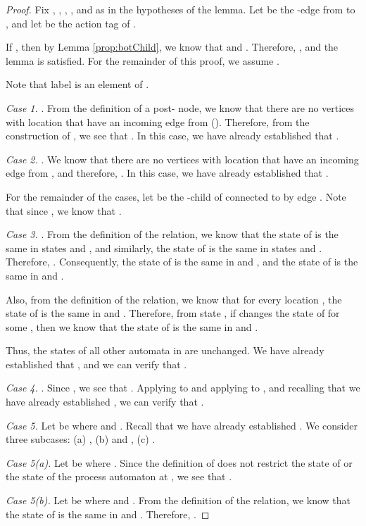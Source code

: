 \documentclass[11pt]{article}
\numberwithin{theorem}{section}
\begin{document}
\begin{proof}
 Fix , , , , and  as in the hypotheses of the lemma. Let  be the -edge from  to , and let  be the action tag of . 
 
 If , then by Lemma \ref{prop:botChild}, we know that  and . Therefore, , and the lemma is satisfied. For the remainder of this proof, we assume .
 
 Note that label  is an element of .
  
  \emph{Case 1.} . From the definition of a post- node, we know that there are no vertices with location  that have an incoming edge from  (). Therefore, from the construction of , we see that . In this case, we have already established that .
  
  \emph{Case 2.} . We know that there are no vertices with location  that have an incoming edge from , and therefore, . In this case, we have already established that .
  
For the remainder of the cases, let  be the -child of  connected to  by edge . Note that since , we know that .  


  
 \emph{Case 3.} . From the definition of the  relation, we know that the state of   is the same in states  and , and similarly, the state of  is the same in states  and . Therefore, . Consequently, the state of   is the same in  and , and the state of  is the same in  and . 
 
 Also, from the definition of the  relation, we know that for every location , the state of  is the same in  and . Therefore, from state , if  changes the state of  for some , then we know that the state of  is the same in  and . 
 
Thus, the states of all other automata in  are unchanged. We have already established that , and we can verify that .
 


\emph{Case 4.} . Since , we see that . Applying  to  and applying  to , and recalling that we have already established , we can verify that .

 
 \emph{Case 5.} Let  be  where  and . Recall that we have already established . 
 We consider three subcases: (a) , (b)  and , (c) .
 
 \emph{Case 5(a).} Let  be  where . Since the definition of  does not restrict the state of  or the state of the process automaton at , we see that .
 
 \emph{Case 5(b).} Let  be  where  and . From the definition of the  relation, we know that the state of  is the same in  and . Therefore, .
 

\end{proof}
\end{document}
